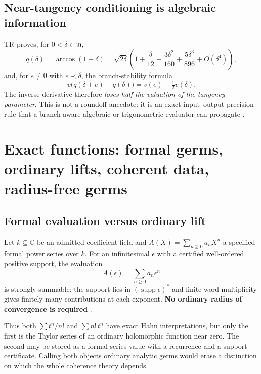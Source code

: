 \documentclass[11pt,letterpaper]{article}
\numberwithin{equation}{section}
\theoremstyle{definition}
\theoremstyle{remark}
\newcommand{\C}{\mathbb C}
\newcommand{\mm}{\mathfrak m}
\newcommand{\supp}{\operatorname{supp}}
\begin{document}
\subsection{Near-tangency conditioning is algebraic information}
\label{cas:sub-tangency}
TR proves, for $0<\delta\in\mm$,
\begin{equation}\label{cas:eq-acos}
 q(\delta)=\arccos(1-\delta)
 =\sqrt{2\delta}\left(1+\frac{\delta}{12}+\frac{3\delta^2}{160}
 +\frac{5\delta^3}{896}+O(\delta^4)\right),
\end{equation}
and, for $e\ne0$ with $e\prec\delta$, the branch-stability formula
\begin{equation}\label{cas:eq-acosprecision}
 v\bigl(q(\delta+e)-q(\delta)\bigr)=v(e)-\tfrac12v(\delta).
\end{equation}
The inverse derivative therefore \emph{loses half the valuation of the tangency
parameter}. This is not a roundoff anecdote: it is an exact input--output
precision rule that a branch-aware algebraic or trigonometric evaluator can
propagate \cite{cas:SourceTrig}.

\section{Exact functions: formal germs, ordinary lifts, coherent data, radius-free germs}
\label{cas:sec-functions}

\subsection{Formal evaluation versus ordinary lift}
\label{cas:sub-formaleval}
Let $k\subseteq\C$ be an admitted coefficient field and $A(X)=\sum_{n\ge0}a_nX^n$
a specified formal power series over $k$. For an infinitesimal $\epsilon$ with a
certified well-ordered positive support, the evaluation
\begin{equation}\label{cas:eq-formaleval}
 A(\epsilon)=\sum_{n\ge0}a_n\epsilon^n
\end{equation}
is strongly summable: the support lies in $(\supp\epsilon)^*$ and finite word
multiplicity gives finitely many contributions at each exponent.
\textbf{No ordinary radius of convergence is required}
\cite{cas:SourceAnalysisThree}.

Thus both $\sum t^n/n!$ and $\sum n!\,t^n$ have exact Hahn interpretations, but
only the first is the Taylor series of an ordinary holomorphic function near
zero. The second may be stored as a formal-series value with a recurrence and a
support certificate. Calling both objects ordinary analytic germs would erase a
distinction on which the whole coherence theory depends.
\end{document}
